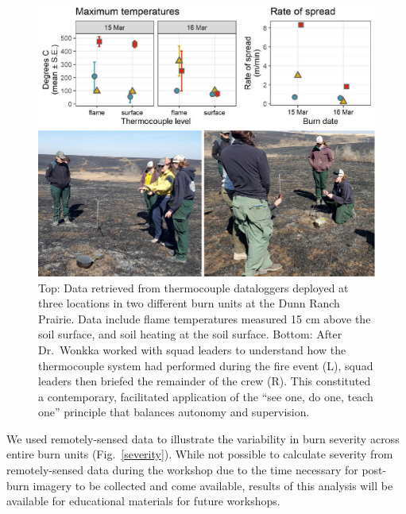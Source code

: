 \documentclass[fire,article,submit,moreauthors,pdftex]{Definitions/mdpi}
\begin{document}
\begin{figure}
\centering
\includegraphics[width=1\columnwidth]{thermocouples.pdf}
\caption{Top: Data retrieved from thermocouple dataloggers deployed at three locations in two different burn units at the Dunn Ranch Prairie. Data include flame temperatures measured 15 cm above the soil surface, and soil heating at the soil surface. Bottom: After Dr.~Wonkka worked with squad leaders to understand how the thermocouple system had performed during the fire event (L), squad leaders then briefed the remainder of the crew (R). This constituted a contemporary, facilitated application of the ``see one, do one, teach one'' principle that balances autonomy and supervision. \label{thermocouples}}
\end{figure}

We used remotely-sensed data to illustrate the variability in burn severity across entire burn units (Fig.~\ref{severity}).
While not possible to calculate severity from remotely-sensed data during the workshop due to the time necessary for post-burn imagery to be collected and come available, results of this analysis will be available for educational materials for future workshops.
\end{document}
